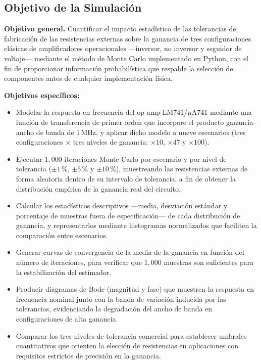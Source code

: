 ﻿\documentclass[12pt, letterpaper]{article}
\begin{document}
\subsection{Objetivo de la Simulación}

\textbf{Objetivo general.}
Cuantificar el impacto estadístico de las tolerancias de fabricación de las
resistencias externas sobre la ganancia de tres configuraciones clásicas de
amplificadores operacionales —inversor, no inversor y seguidor de voltaje—
mediante el método de Monte Carlo implementado en Python, con el fin de
proporcionar información probabilística que respalde la selección
de componentes antes de cualquier implementación física.

\textbf{Objetivos específicos:}

\begin{itemize}[leftmargin=2em]
    \item Modelar la respuesta en frecuencia del op-amp LM741/\(\mu\)A741 %
          mediante una función de transferencia de primer orden que incorpore
          el producto ganancia-ancho de banda de \(1\,\text{MHz}\), y aplicar
          dicho modelo a nueve escenarios (tres configuraciones \(\times\) tres %
          niveles de ganancia: \(\times 10\), \(\times 47\) y \(\times 100\)).

    \item Ejecutar \(1{,}000\) iteraciones Monte Carlo por escenario y por
          nivel de tolerancia (\(\pm 1\,\text{\%}\), \(\pm 5\,\text{\%}\) y
          \(\pm 10\,\text{\%}\)), muestreando las resistencias externas de forma
          aleatoria dentro de su intervalo de tolerancia, a fin de obtener la
          distribución empírica de la ganancia real del circuito.

    \item Calcular los estadísticos descriptivos —media, desviación estándar y
          porcentaje de muestras fuera de especificación— de cada distribución
          de ganancia, y representarlos mediante histogramas normalizados que
          faciliten la comparación entre escenarios.

    \item Generar curvas de convergencia de la media de la ganancia en función
          del número de iteraciones, para verificar que \(1{,}000\) muestras
          son suficientes para la estabilización del estimador.

    \item Producir diagramas de Bode (magnitud y fase) que muestren la
          respuesta en frecuencia nominal junto con la banda de variación
          inducida por las tolerancias, evidenciando la degradación del ancho
          de banda en configuraciones de alta ganancia.

    \item Comparar los tres niveles de tolerancia comercial para establecer
          umbrales cuantitativos que orienten la elección de resistencias en
          aplicaciones con requisitos estrictos de precisión en la ganancia.
\end{itemize}
\end{document}
